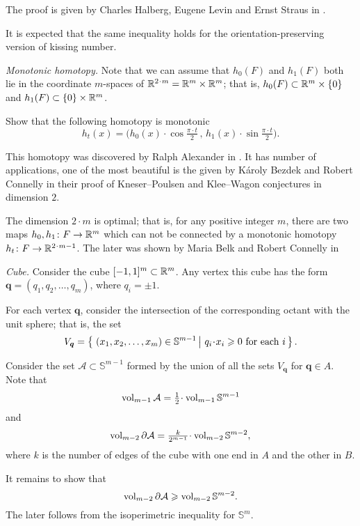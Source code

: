 The proof is given by 
Charles Halberg, 
Eugene Levin 
and Ernst Straus 
in \cite{halberg-levin-straus}.

It is expected that the same inequality holds for the orientation-preserving version of kissing number.



\textit{Monotonic homotopy.}
Note that we can assume
that $h_0(F)$ and $h_1(F)$ both lie in the coordinate $m$-spaces of $\RR^{2\cdot m}=\RR^m\times \RR^m$;
that is,
$h_0(F)\z\subset\RR^m\times\{0\}$
and $h_1(F)\subset  \{0\}\times\mathbb{R}^m$.

Show that the following homotopy is monotonic
\[h_t(x)=\bigl(h_0(x)\cdot \cos\tfrac{\pi\cdot t}2
\,,\,
 h_1(x)\cdot\sin\tfrac{\pi\cdot t}{2}\bigr).\] 


This homotopy was discovered by Ralph Alexander in \cite{ralexander}.
It has number of applications, 
one of the most beautiful is the given 
by K{\'a}roly Bezdek 
and Robert Connelly \cite{bezdek-connelly} 
in their proof of 
Kneser--Poulsen  
and Klee--Wagon conjectures in dimension $2$.

The dimension $2\cdot m$ is optimal;
that is, for any positive integer $m$,
there are two maps $h_0,h_1\colon F\to \mathbb{R}^m$ which can not be connected by a monotonic homotopy $h_t\:F\to\RR^{2\cdot m-1}$.
The later was shown by Maria Belk and Robert Connelly in \cite{belk-connelly}



\textit{Cube.}
Consider the cube $[-1,1]^m\subset \mathbb{R}^m$.
Any vertex this cube has the form $\bm{q}=(q_1,q_2,\dots,q_m)$,
where  $q_i=\pm1$.

For each vertex $\bm{q}$,
consider the intersection of the corresponding octant with the unit sphere;
that is, the set
\[V_{\bm{q}}=\set{(x_1,x_2,\dots,x_m)\in\mathbb{S}^{m-1}}{q_i\cdot x_i\ge 0\ \text{for each}\ i}.\]

Consider the set $\mathcal{A}\subset\mathbb{S}^{m-1}$
formed by the union of all the sets $V_{\bm{q}}$ for $\bm{q}\in A$.
Note that 
\[\vol_{m-1}\mathcal{A}=\tfrac12\cdot\vol_{m-1}\mathbb{S}^{m-1}\]
and 
\[\vol_{m-2}\partial\mathcal{A}
=
\tfrac k{2^{m-1}}\cdot\vol_{m-2}\mathbb{S}^{m-2},\]
where $k$ is the number of edges of the cube with one end in $A$ and the other in $B$.

It remains to  show that 
\[\operatorname{\rm vol}_{m-2}\partial\mathcal{A}
\geqslant \operatorname{\rm vol}_{m-2}\mathbb{S}^{m-2}.\]
The later follows from the isoperimetric inequality for $\mathbb{S}^m$. 

